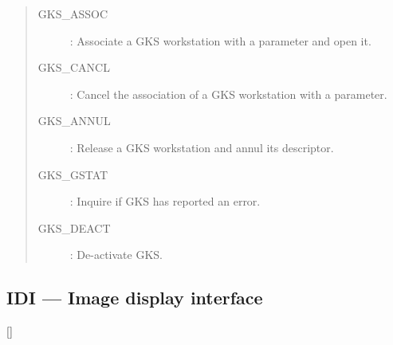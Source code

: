 \begin{quote}
\begin{description}
\item [GKS\_ASSOC] : Associate a GKS workstation with a parameter and open it.
\item [GKS\_CANCL] : Cancel the association of a GKS workstation with a parameter.
\item [GKS\_ANNUL] : Release a GKS workstation and annul its descriptor.
\item [GKS\_GSTAT] : Inquire if GKS has reported an error.
\item [GKS\_DEACT] : De-activate GKS.
\end{description}
\end{quote}

\newpage

\subsection{IDI --- Image display interface}

\vspace{-9mm}

\hfill []

\vspace{2mm}

